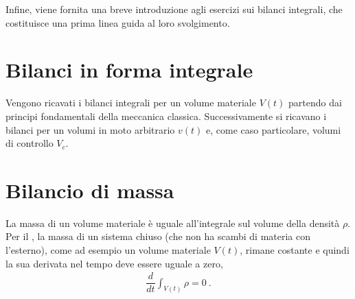 \documentclass[letterpaper,10pt,italian]{jupyterBook}
\begin{document}
\sphinxAtStartPar
Infine, viene fornita una breve introduzione agli esercizi sui bilanci
integrali, che costituisce una prima linea guida al loro svolgimento.


\section{Bilanci in forma integrale}
\label{\detokenize{polimi/fluidmechanics-ita/template/capitoli/04_bilanci/04teoria:bilanci-in-forma-integrale}}\label{\detokenize{polimi/fluidmechanics-ita/template/capitoli/04_bilanci/04teoria:fluid-mechanics-balance-integral}}
\sphinxAtStartPar
Vengono ricavati i bilanci integrali per un volume materiale \(V(t)\)
partendo dai principi fondamentali della meccanica classica.
Successivamente si ricavano i bilanci per un volumi in moto arbitrario
\(v(t)\) e, come caso particolare, volumi di controllo \(V_c\).


\section{Bilancio di massa}
\label{\detokenize{polimi/fluidmechanics-ita/template/capitoli/04_bilanci/04teoria:bilancio-di-massa}}
\sphinxAtStartPar
La massa di un volume materiale è uguale all’integrale sul volume della
densità \(\rho\). Per il , la
massa di un sistema chiuso (che non ha scambi di materia con l’esterno),
come ad esempio un volume materiale \(V(t)\), rimane costante e quindi la
sua derivata nel tempo deve essere uguale a zero,
\begin{equation*}
\begin{split}\dfrac{d}{dt} \int_{V(t)} \rho = 0 \ .\end{split}
\end{equation*}
\end{document}
